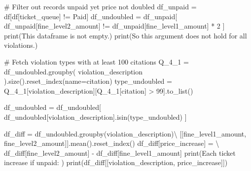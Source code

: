 \documentclass[
  letterpaper,
  DIV=11,
  numbers=noendperiod]{scrartcl}
\newenvironment{Shaded}{\begin{snugshade}}{\end{snugshade}}
\newcommand{\BuiltInTok}[1]{\textcolor[rgb]{0.00,0.23,0.31}{#1}}
\newcommand{\CommentTok}[1]{\textcolor[rgb]{0.37,0.37,0.37}{#1}}
\newcommand{\DecValTok}[1]{\textcolor[rgb]{0.68,0.00,0.00}{#1}}
\newcommand{\NormalTok}[1]{\textcolor[rgb]{0.00,0.23,0.31}{#1}}
\newcommand{\OperatorTok}[1]{\textcolor[rgb]{0.37,0.37,0.37}{#1}}
\newcommand{\StringTok}[1]{\textcolor[rgb]{0.13,0.47,0.30}{#1}}
\begin{document}
\begin{Shaded}
\begin{Highlighting}[]
\CommentTok{\# Filter out records unpaid yet price not doubled}
\NormalTok{df\_unpaid }\OperatorTok{=}\NormalTok{ df[df[}\StringTok{\textquotesingle{}ticket\_queue\textquotesingle{}}\NormalTok{] }\OperatorTok{!=} \StringTok{\textquotesingle{}Paid\textquotesingle{}}\NormalTok{]}
\NormalTok{df\_undoubled }\OperatorTok{=}\NormalTok{ df\_unpaid[}
\NormalTok{    df\_unpaid[}\StringTok{\textquotesingle{}fine\_level2\_amount\textquotesingle{}}\NormalTok{] }\OperatorTok{!=}\NormalTok{ df\_unpaid[}\StringTok{\textquotesingle{}fine\_level1\_amount\textquotesingle{}}\NormalTok{] }\OperatorTok{*} \DecValTok{2}
\NormalTok{]}
\BuiltInTok{print}\NormalTok{(}\StringTok{\textquotesingle{}This dataframe is not empty.\textquotesingle{}}\NormalTok{)}
\BuiltInTok{print}\NormalTok{(}\StringTok{\textquotesingle{}So this argument does not hold for all violations.\textquotesingle{}}\NormalTok{)}

\CommentTok{\# Fetch violation types with at least 100 citations}
\NormalTok{Q\_4\_1 }\OperatorTok{=}\NormalTok{ df\_undoubled.groupby(}
    \StringTok{\textquotesingle{}violation\_description\textquotesingle{}}
\NormalTok{    ).size().reset\_index(name}\OperatorTok{=}\StringTok{\textquotesingle{}citation\textquotesingle{}}\NormalTok{)}
\NormalTok{type\_undoubled }\OperatorTok{=}\NormalTok{ Q\_4\_1[}\StringTok{\textquotesingle{}violation\_description\textquotesingle{}}\NormalTok{][Q\_4\_1[}\StringTok{\textquotesingle{}citation\textquotesingle{}}\NormalTok{] }\OperatorTok{\textgreater{}} \DecValTok{99}\NormalTok{].to\_list()}

\NormalTok{df\_undoubled }\OperatorTok{=}\NormalTok{ df\_undoubled[}
\NormalTok{    df\_undoubled[}\StringTok{\textquotesingle{}violation\_description\textquotesingle{}}\NormalTok{].isin(type\_undoubled)}
\NormalTok{    ]}

\NormalTok{df\_diff }\OperatorTok{=}\NormalTok{ df\_undoubled.groupby(}\StringTok{\textquotesingle{}violation\_description\textquotesingle{}}\NormalTok{)}\OperatorTok{\textbackslash{}}
\NormalTok{    [[}\StringTok{\textquotesingle{}fine\_level1\_amount\textquotesingle{}}\NormalTok{, }\StringTok{\textquotesingle{}fine\_level2\_amount\textquotesingle{}}\NormalTok{]].mean().reset\_index()}
\NormalTok{df\_diff[}\StringTok{\textquotesingle{}price\_increase\textquotesingle{}}\NormalTok{] }\OperatorTok{=} \OperatorTok{\textbackslash{}}
\NormalTok{    df\_diff[}\StringTok{\textquotesingle{}fine\_level2\_amount\textquotesingle{}}\NormalTok{] }\OperatorTok{{-}}\NormalTok{ df\_diff[}\StringTok{\textquotesingle{}fine\_level1\_amount\textquotesingle{}}\NormalTok{]}
\BuiltInTok{print}\NormalTok{(}\StringTok{\textquotesingle{}Each ticket increase if unpaid: \textquotesingle{}}\NormalTok{)}
\BuiltInTok{print}\NormalTok{(df\_diff[[}\StringTok{\textquotesingle{}violation\_description\textquotesingle{}}\NormalTok{, }\StringTok{\textquotesingle{}price\_increase\textquotesingle{}}\NormalTok{]])}
\end{Highlighting}
\end{Shaded}
\end{document}
